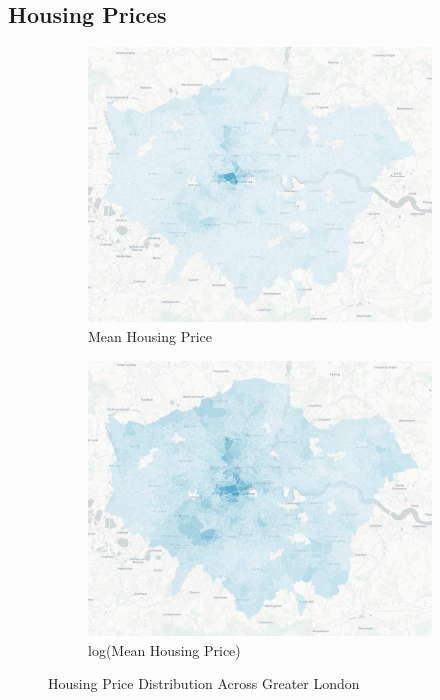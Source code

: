 \documentclass{article}
\begin{document}
\subsection{Housing Prices}
\begin{figure}[H]
  \centering
  \begin{subfigure}{.45\textwidth}
      \centering
      \includegraphics[width=.95\linewidth]{images/housing_raw_mean.png}
      \caption{Mean Housing Price}
      \label{fig:1(a)}
  \end{subfigure}
  \begin{subfigure}{.45\textwidth}
      \centering
      \includegraphics[width=.95\linewidth]{images/housing_log_mean.png}
      \caption{log(Mean Housing Price)}
      \label{fig:1(b)}
  \end{subfigure}
  \caption{Housing Price Distribution Across Greater London}
  \label{fig:price_distribution}
\end{figure}
\end{document}
